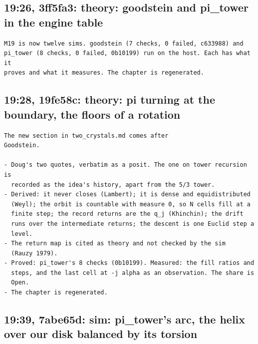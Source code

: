 \subsection{\texorpdfstring{19:26, 3ff5fa3: theory: goodstein and pi\_\allowbreak{}tower in the engine table}{19:26, 3ff5fa3: theory: goodstein and pi\_tower in the engine table}}

\begin{Verbatim}
M19 is now twelve sims. goodstein (7 checks, 0 failed, c633988) and
pi_tower (8 checks, 0 failed, 0b10199) run on the host. Each has what it
proves and what it measures. The chapter is regenerated.
\end{Verbatim}

\subsection{\texorpdfstring{19:28, 19fe58c: theory: pi turning at the boundary, the floors of a rotation}{19:28, 19fe58c: theory: pi turning at the boundary, the floors of a rotation}}

\begin{Verbatim}
The new section in two_crystals.md comes after
Goodstein.

- Doug's two quotes, verbatim as a posit. The one on tower recursion is
  recorded as the idea's history, apart from the 5/3 tower.
- Derived: it never closes (Lambert); it is dense and equidistributed
  (Weyl); the orbit is countable with measure 0, so N cells fill at a
  finite step; the record returns are the q_j (Khinchin); the drift
  runs over the intermediate returns; the descent is one Euclid step a
  level.
- The return map is cited as theory and not checked by the sim
  (Rauzy 1979).
- Proved: pi_tower's 8 checks (0b10199). Measured: the fill ratios and
  steps, and the last cell at -j alpha as an observation. The share is
  Open.
- The chapter is regenerated.
\end{Verbatim}

\subsection{\texorpdfstring{19:39, 7abe65d: sim: pi\_\allowbreak{}tower's arc, the helix over our disk balanced by its torsion}{19:39, 7abe65d: sim: pi\_tower's arc, the helix over our disk balanced by its torsion}}

